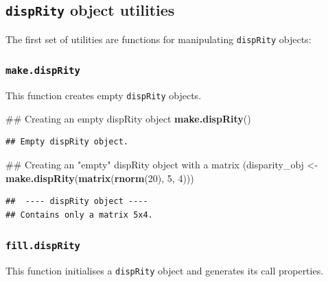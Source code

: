 \documentclass[]{book}
\newenvironment{Shaded}{\begin{snugshade}}{\end{snugshade}}
\newcommand{\KeywordTok}[1]{\textcolor[rgb]{0.13,0.29,0.53}{\textbf{#1}}}
\newcommand{\DecValTok}[1]{\textcolor[rgb]{0.00,0.00,0.81}{#1}}
\newcommand{\StringTok}[1]{\textcolor[rgb]{0.31,0.60,0.02}{#1}}
\newcommand{\OperatorTok}[1]{\textcolor[rgb]{0.81,0.36,0.00}{\textbf{#1}}}
\newcommand{\NormalTok}[1]{#1}
\theoremstyle{definition}
\theoremstyle{definition}
\theoremstyle{definition}
\theoremstyle{remark}
\begin{document}
\subsection{\texorpdfstring{\texttt{dispRity} object utilities
}{dispRity object utilities }}\label{disprity-object-utilities}

The first set of utilities are functions for manipulating
\texttt{dispRity} objects:

\subsubsection{\texorpdfstring{\texttt{make.dispRity}}{make.dispRity}}\label{make.disprity}

This function creates empty \texttt{dispRity} objects.

\begin{Shaded}
\begin{Highlighting}[]
\NormalTok{## Creating an empty dispRity object}
\KeywordTok{make.dispRity}\NormalTok{()}
\end{Highlighting}
\end{Shaded}

\begin{verbatim}
## Empty dispRity object.
\end{verbatim}

\begin{Shaded}
\begin{Highlighting}[]
\NormalTok{## Creating an "empty" dispRity object with a matrix}
\NormalTok{(disparity_obj <-}\StringTok{ }\KeywordTok{make.dispRity}\NormalTok{(}\KeywordTok{matrix}\NormalTok{(}\KeywordTok{rnorm}\NormalTok{(}\DecValTok{20}\NormalTok{), }\DecValTok{5}\NormalTok{, }\DecValTok{4}\NormalTok{)))}
\end{Highlighting}
\end{Shaded}

\begin{verbatim}
##  ---- dispRity object ---- 
## Contains only a matrix 5x4.
\end{verbatim}

\subsubsection{\texorpdfstring{\texttt{fill.dispRity}}{fill.dispRity}}\label{fill.disprity}

This function initialises a \texttt{dispRity} object and generates its
call properties.

\begin{Shaded}
\end{Shaded}
\end{document}
